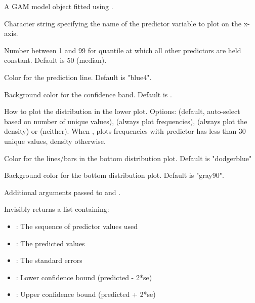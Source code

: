 \documentclass[a4paper]{book}
\begin{document}
\begin{Arguments}
\begin{ldescription}
\item[\code{model}] A GAM model object fitted using .

\item[\code{predictor}] Character string specifying the name of the predictor variable
to plot on the x-axis.

\item[\code{quantile.others}] Number between 1 and 99 for quantile
at which all other predictors are held constant. Default is 50 (median).

\item[\code{col}] Color for the prediction line. Default is "blue4".

\item[\code{bg}] Background color for the confidence band. Default is
.

\item[\code{plot2}] How to plot the distribution in the lower plot. Options:  (default,
auto-select based on number of unique values),  (always plot frequencies),
 (always plot the density) or  (neither). When , 
plots frequencies with predictor has less than 30 unique values, density otherwise.

\item[\code{col2}] Color for the lines/bars in the bottom distribution plot. Default is "dodgerblue"

\item[\code{bg2}] Background color for the bottom distribution plot. Default is "gray90".

\item[\code{...}] Additional arguments passed to  and .
\end{ldescription}
\end{Arguments}
%
\begin{Value}
Invisibly returns a list containing:
\begin{itemize}

\item{} : The sequence of predictor values used
\item{} : The predicted values
\item{} : The standard errors
\item{} : Lower confidence bound (predicted - 2*se)
\item{} : Upper confidence bound (predicted + 2*se)

\end{itemize}

\end{Value}
\end{document}
